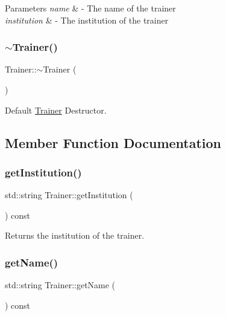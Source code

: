 \begin{DoxyParams}{Parameters}
{\em name} & -\/ The name of the trainer \\
\hline
{\em institution} & -\/ The institution of the trainer \\
\hline
\end{DoxyParams}
\mbox{\label{classTrainer_aa3d993d1eb090f4111e12a710fe9d3f6}} 
\subsubsection{\texorpdfstring{$\sim$\+Trainer()}{~Trainer()}}
{\footnotesize\ttfamily Trainer\+::$\sim$\+Trainer (\begin{DoxyParamCaption}{ }\end{DoxyParamCaption})}



Default \mbox{\hyperlink{classTrainer}{Trainer}} Destructor. 



\subsection{Member Function Documentation}
\mbox{\label{classTrainer_a92ce4244bea56ae32c0ba33fdd959667}} 
\subsubsection{\texorpdfstring{get\+Institution()}{getInstitution()}}
{\footnotesize\ttfamily std\+::string Trainer\+::get\+Institution (\begin{DoxyParamCaption}{ }\end{DoxyParamCaption}) const\hspace{0.3cm}{\ttfamily [inline]}}



Returns the institution of the trainer. 

\mbox{\label{classTrainer_a4bf23e8eaefc7c2f400b4ba14f2e1c69}} 
\subsubsection{\texorpdfstring{get\+Name()}{getName()}}
{\footnotesize\ttfamily std\+::string Trainer\+::get\+Name (\begin{DoxyParamCaption}{ }\end{DoxyParamCaption}) const\hspace{0.3cm}{\ttfamily [inline]}}



